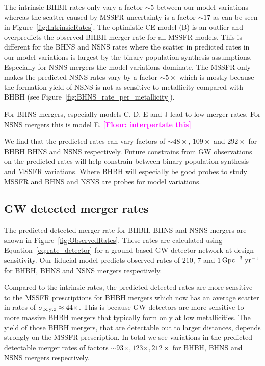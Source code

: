 \documentclass[twocolumn]{aastex63}
\newcommand{\floor}[1]{\textbf{\textcolor{magenta}{[Floor: #1]}}}
\newcommand\bhnsSingle{BHNS\xspace}
\newcommand\rateObsBHBH{$210$\xspace}
\newcommand\rateObsBHNS{$7$\xspace}
\newcommand\rateObsNSNS{$1$\xspace}
\newcommand{\yearmin}{\ensuremath{\,\rm{yr}^{-1}}\xspace}
\newcommand{\GpcminThree}{\ensuremath{\,\rm{Gpc}^{-3}}\xspace}
\begin{document}
The intrinsic BHBH rates only vary a factor $\sim 5$ between our model variations whereas the scatter caused by \ac{MSSFR} uncertainty is a factor $\sim 17$ as can be seen in Figure~\ref{fig:IntrinsicRates}. The optimistic \ac{CE} model (B) is an outlier and overpredicts  the observed BHBH merger rate for all \ac{MSSFR} models. 
This is different for the \bhnsSingle and NSNS rates where the scatter in predicted rates in our model variations is largest by the binary population synthesis assumptions. Especially for NSNS mergers the model variations dominate. The \ac{MSSFR}  only makes the predicted NSNS rates vary by a factor $\sim 5\times$ which is mostly because the formation yield of NSNS is not as sensitive to metallicity compared with BHBH (see Figure~\ref{fig:BHNS_rate_per_metallicity}). 

For \bhnsSingle mergers, especially models C, D, E and J lead to low merger rates. For NSNS mergers this is model E. \floor{interpertate this}

We find that the predicted rates can vary factors of $\sim 48\times $, $109\times $ and $292\times $ for BHBH \bhnsSingle and NSNS respectively. 
Future constrains from \ac{GW} observations on the predicted rates will help constrain between binary population synthesis and \ac{MSSFR} variations. Where BHBH will especially be good probes to study \ac{MSSFR} and \bhnsSingle and NSNS are probes for model variations. 


\subsection{GW detected merger rates}
\label{subsec:results-variations-rates-observed}

The predicted detected merger rate for BHBH, \bhnsSingle and NSNS mergers  are shown in Figure~\ref{fig:ObservedRates}. 
These rates are calculated using Equation~\ref{eq:rate_detector} for a ground-based \ac{GW} detector network at design sensitivity. 
Our fiducial model predicts observed rates of \rateObsBHBH, \rateObsBHNS and  \rateObsNSNS  \GpcminThree \yearmin for BHBH, \bhnsSingle and NSNS mergers respectively.

Compared to the intrinsic rates, the predicted detected rates are more sensitive to the \ac{MSSFR} prescriptions for BHBH mergers which now has an average scatter in rates of $\sigma_{\rm{.x.y.z}} \approx 44\times$. This  is because \ac{GW} detectors are more sensitive to more massive BHBH mergers that typically form only at low metallicities. The yield of those BHBH mergers, that are detectable out to larger distances, depends strongly on the \ac{MSSFR} prescription. In total we see variations in the predicted detectable merger rates of factors $\sim 93\times, 123\times, 212\times$ for BHBH, \bhnsSingle and NSNS mergers respectively. 
\end{document}
